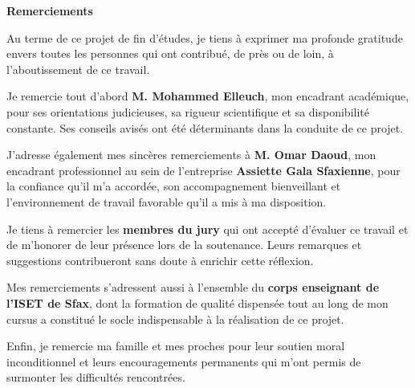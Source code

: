\newpage
\thispagestyle{plain}
\vspace*{1cm}

\begin{center}
    {\Large \textbf{Remerciements}}
\end{center}

\vspace{1.5cm}

Au terme de ce projet de fin d'études, je tiens à exprimer ma profonde gratitude envers toutes les personnes qui ont contribué, de près ou de loin, à l'aboutissement de ce travail.

\vspace{0.5cm}

Je remercie tout d'abord \textbf{M. Mohammed Elleuch}, mon encadrant académique, pour ses orientations judicieuses, sa rigueur scientifique et sa disponibilité constante. Ses conseils avisés ont été déterminants dans la conduite de ce projet.

\vspace{0.5cm}

J'adresse également mes sincères remerciements à \textbf{M. Omar Daoud}, mon encadrant professionnel au sein de l'entreprise \textbf{Assiette Gala Sfaxienne}, pour la confiance qu'il m'a accordée, son accompagnement bienveillant et l'environnement de travail favorable qu'il a mis à ma disposition.

\vspace{0.5cm}

Je tiens à remercier les \textbf{membres du jury} qui ont accepté d'évaluer ce travail et de m'honorer de leur présence lors de la soutenance. Leurs remarques et suggestions contribueront sans doute à enrichir cette réflexion.

\vspace{0.5cm}

Mes remerciements s'adressent aussi à l'ensemble du \textbf{corps enseignant de l'ISET de Sfax}, dont la formation de qualité dispensée tout au long de mon cursus a constitué le socle indispensable à la réalisation de ce projet.

\vspace{0.5cm}

Enfin, je remercie ma famille et mes proches pour leur soutien moral inconditionnel et leurs encouragements permanents qui m'ont permis de surmonter les difficultés rencontrées.

\clearpage
